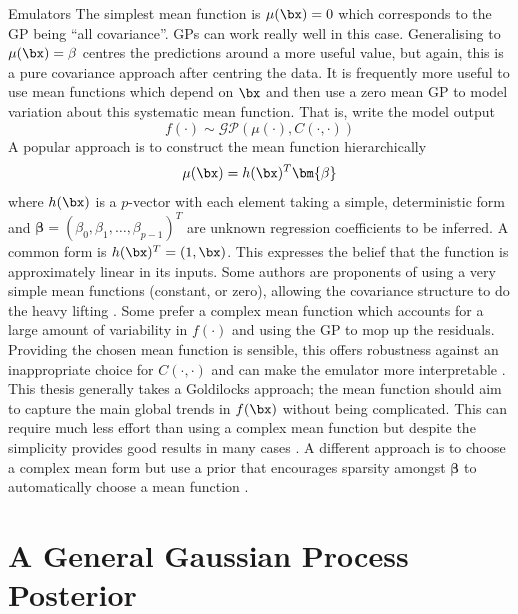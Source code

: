 \begin{chapter}{Emulators \label{Ch:Emulators}}
The simplest mean function is $\mu(\bx) = 0$ which corresponds to the GP being ``all covariance''. GPs can work really well in this case. Generalising to $\mu(\bx) = \beta$ centres the predictions around a more useful value, but again, this is a pure covariance approach after centring the data. It is frequently more useful to use mean functions which depend on $\bx$ and then use a zero mean GP to model variation about this systematic mean function. That is, write the model output
\begin{equation}
  f(\cdot) \sim \mathcal{GP}(\mu(\cdot), C(\cdot, \cdot))
\end{equation}
A popular approach is to construct the mean function hierarchically
\begin{equation}
  \mu(\bx) = h(\bx)^T \bm{\beta}
\end{equation}
where $h(\bx)$ is a $p$-vector with each element taking a simple, deterministic form and $\bm{\beta} = (\beta_0, \beta_1, \ldots, \beta_{p-1})^T$ are unknown regression coefficients to be inferred. A common form is $h(\bx)^T = (1, \bx)$. This expresses the belief that the function is approximately linear in its inputs. Some authors are proponents of using a very simple mean functions (constant, or zero), allowing the covariance structure to do the heavy lifting \citep{Henderson09,Zhang2019}. Some prefer a complex mean function which accounts for a large amount of variability in $f(\cdot)$ and using the GP to mop up the residuals. Providing the chosen mean function is sensible, this offers robustness against an inappropriate choice for $C(\cdot, \cdot)$ and can make the emulator more interpretable \citep{Xu16,Vernon2010}. This thesis generally takes a Goldilocks approach; the mean function should aim to capture the main global trends in $f(\bx)$ without being complicated. This can require much less effort than using  a complex mean function but despite the simplicity provides good results in many cases \citep{Ohagan01, Fricker2013, Fisher2021}. A different approach is to choose a complex mean form but use a prior that encourages sparsity amongst $\bm{\beta}$ to automatically choose a mean function \citep{Seshadri2020}.

\section{A General Gaussian Process Posterior}


\end{chapter}

